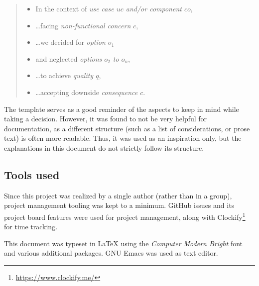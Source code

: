 \begin{quote}
  \begin{itemize}[parsep=5pt]
    \item In the context of \emph{use case $uc$ and/or component $co$},
    \item \ldots facing \emph{non-functional concern $c$},
    \item \ldots we decided for \emph{option $o_1$}
    \item and neglected \emph{options $o_2$ to $o_n$},
    \item \ldots to achieve \emph{quality $q$},
    \item \ldots accepting downside \emph{consequence $c$}.
  \end{itemize}
\end{quote}

The template serves as a good reminder of the aspects to keep in mind
while taking a decision. However, it was found to not be very helpful for
documentation, as a different structure (such as a list of considerations, or
prose text) is often more readable. Thus, it was used as an inspiration only,
but the explanations in this document do not strictly follow its structure.


\subsection{Tools used}
Since this project was realized by a single author (rather than in a group),
project management tooling was kept to a minimum. GitHub issues and its project
board features were used for project management, along with
Clockify\footnote{\url{https://www.clockify.me/}} for time tracking.

This document was typeset in \LaTeX{} using the \emph{Computer Modern Bright}
font and various additional packages. GNU Emacs was used as text editor.

